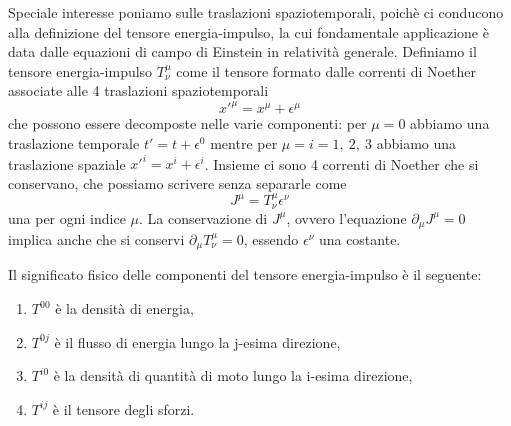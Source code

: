     Speciale interesse poniamo sulle traslazioni spaziotemporali, poichè ci conducono alla definizione del tensore energia-impulso, la cui fondamentale applicazione è data dalle equazioni di campo di Einstein in relatività generale. 
    Definiamo il tensore energia-impulso $T^\mu_\nu$ come il tensore formato dalle correnti di Noether associate alle 4 traslazioni spaziotemporali
    \begin{equation*}
        x'^\mu = x^\mu + \epsilon^\mu
    \end{equation*}
    che possono essere decomposte nelle varie componenti: per $\mu=0$ abbiamo una traslazione temporale $t' = t + \epsilon^0$ mentre per $\mu=i=1,~2,~3$ abbiamo una traslazione spaziale $x'^i = x^i + \epsilon^i$. Insieme ci sono 4 correnti di Noether che si conservano, che possiamo scrivere senza separarle come 
    \begin{equation} \label{tensenimp}
        J^\mu = T^\mu_\nu \epsilon^\nu
    \end{equation}
    una per ogni indice $\mu$. La conservazione di $J^\mu$, ovvero l'equazione $\partial_\mu J^\mu = 0 $ implica anche che si conservi $\partial_\mu T^\mu_\nu = 0$, essendo $\epsilon^\nu$ una costante.

    Il significato fisico delle componenti del tensore energia-impulso è il seguente: 
    \begin{enumerate}
        \item $T^{00}$ è la densità di energia,
        \item $T^{0j}$ è il flusso di energia lungo la j-esima direzione,
        \item $T^{i0}$ è la densità di quantità di moto lungo la i-esima direzione,
        \item $T^{ij}$ è il tensore degli sforzi.
    \end{enumerate}

